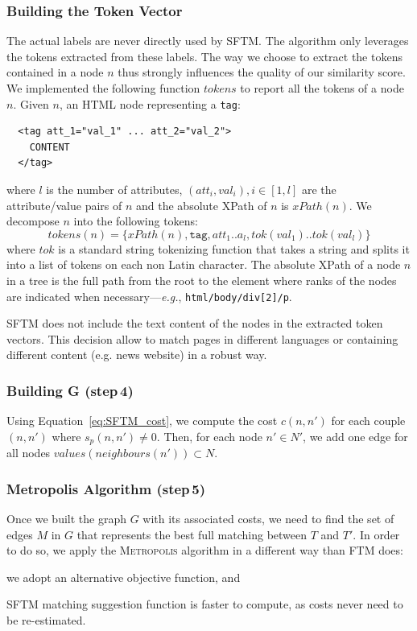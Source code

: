 \subsubsection{Building the Token Vector}\label{tokenSelection}
The actual labels are never directly used by SFTM. The algorithm only leverages the tokens extracted from these labels. The way we choose to extract the tokens contained in a node $n$ thus strongly influences the quality of our similarity score.
We implemented the following function $tokens$ to report all the tokens of a node $n$.
Given $n$, an HTML node representing a \texttt{tag}:
\begin{verbatim}
  <tag att_1="val_1" ... att_2="val_2">
    CONTENT
  </tag> 
\end{verbatim}
where $l$ is the number of attributes, $(att_i, val_i), i \in [1,l]$ are the attribute/value pairs of $n$ and the absolute XPath of $n$ is $xPath(n)$.
We decompose $n$ into the following tokens:
\begin{equation}
	tokens(n) = \{xPath(n), \texttt{tag}, att_1..a_l, tok(val_1)..tok(val_l)\}
\end{equation}
where $tok$ is a standard string tokenizing function that takes a string and splits it into a list of tokens on each non Latin character.
The absolute XPath of a node $n$ in a tree is the full path from the root to the element where ranks of the nodes are indicated when necessary---\emph{e.g.}, \texttt{html/body/div[2]/p}.

SFTM does not include the text content of the nodes in the extracted token vectors.
This decision allow to match pages in different languages or containing different content (e.g. news website) in a robust way.

\subsubsection{Building G (step\,4)}
Using Equation~\ref{eq:SFTM_cost}, we compute the cost $c(n,n')$ for each couple $(n,n')$ where $s_p(n,n') \neq 0$.
Then, for each node $n'\in N'$, we add one edge for all nodes $values(neighbours(n')) \subset N$.

\subsubsection{Metropolis Algorithm (step\,5)}
Once we built the graph $G$ with its associated costs, we need to find the set of edges $M$ in $G$ that represents the best full matching between $T$ and $T'$.
In order to do so, we apply the \textsc{Metropolis} algorithm in a different way than FTM does: 
\begin{inparaenum}
	\item we adopt an alternative objective function, and
    \item SFTM matching suggestion function is faster to compute, as costs never need to be re-estimated.
\end{inparaenum}

